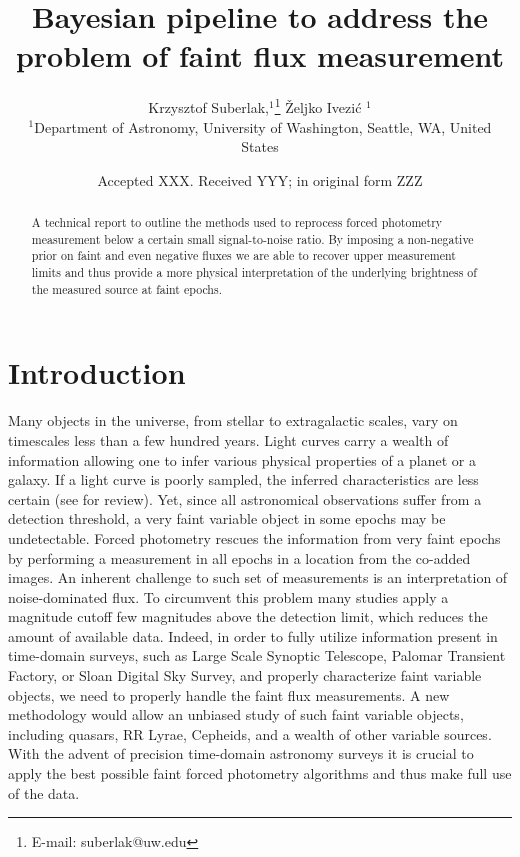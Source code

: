 \documentclass[fleqn,usenatbib]{mnras}  %
\title[Faint pipeline]{Bayesian pipeline to address the problem of faint flux measurement}
\author[K. Suberlak et al.]{
Krzysztof Suberlak,$^{1}$\thanks{E-mail: suberlak@uw.edu}
\v{Z}eljko Ivezi\'c $^{1}$
\\
$^{1}$Department of Astronomy, University of Washington, Seattle, WA, United States\\
}
\date{Accepted XXX. Received YYY; in original form ZZZ}
\begin{document}
\label{firstpage}
\pagerange{\pageref{firstpage}--\pageref{lastpage}}
\maketitle

\begin{abstract}
A technical report to outline the methods used to reprocess forced photometry measurement below a certain small signal-to-noise ratio. By imposing a non-negative prior on faint and even negative fluxes we  are able to recover upper measurement limits and thus provide a more physical interpretation of the underlying brightness of the measured source at faint epochs. 
\end{abstract}






\section{Introduction}
\label{sec:intro}

Many objects in the universe, from stellar to extragalactic scales, vary on timescales less than a few hundred years. Light curves carry a wealth of information allowing one to infer various physical properties of a planet or a galaxy. If a light curve is poorly sampled, the inferred  characteristics are less certain (see \cite{hogg1998} for review). Yet, since all  astronomical observations suffer from a detection threshold, a very faint variable object in some epochs may be undetectable. Forced photometry rescues the information from very faint epochs by performing a measurement in all epochs in a location from the co-added images. An inherent challenge to such set of measurements is an interpretation of noise-dominated flux. To circumvent this problem many studies apply a magnitude cutoff few magnitudes above the detection limit, which reduces the amount of available data. Indeed, in order to fully utilize information present in time-domain surveys, such as Large Scale Synoptic Telescope, Palomar Transient Factory, or Sloan Digital Sky Survey, and properly characterize faint variable objects, we need to properly handle the faint flux measurements. A new methodology would allow an unbiased  study of such faint variable objects, including quasars,  RR Lyrae,  Cepheids, and a wealth of other variable sources.  With the advent of precision  time-domain astronomy  surveys it is crucial to apply the best possible faint forced photometry algorithms and thus make full use of the  data.  
\end{document}
